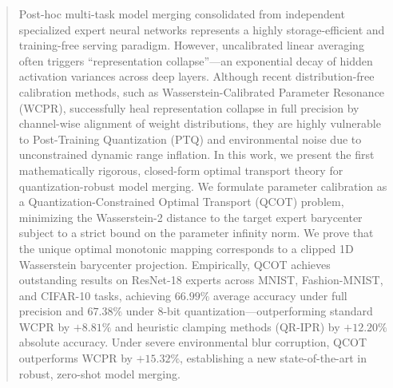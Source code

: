 \documentclass{article}
\theoremstyle{plain}
\theoremstyle{definition}
\theoremstyle{remark}
\begin{document}

\printAffiliationsAndNotice{}

\begin{abstract}
Post-hoc multi-task model merging consolidated from independent specialized expert neural networks represents a highly storage-efficient and training-free serving paradigm. However, uncalibrated linear averaging often triggers ``representation collapse''—an exponential decay of hidden activation variances across deep layers. Although recent distribution-free calibration methods, such as Wasserstein-Calibrated Parameter Resonance (WCPR), successfully heal representation collapse in full precision by channel-wise alignment of weight distributions, they are highly vulnerable to Post-Training Quantization (PTQ) and environmental noise due to unconstrained dynamic range inflation. In this work, we present the first mathematically rigorous, closed-form optimal transport theory for quantization-robust model merging. We formulate parameter calibration as a Quantization-Constrained Optimal Transport (QCOT) problem, minimizing the Wasserstein-2 distance to the target expert barycenter subject to a strict bound on the parameter infinity norm. We prove that the unique optimal monotonic mapping corresponds to a clipped 1D Wasserstein barycenter projection. Empirically, QCOT achieves outstanding results on ResNet-18 experts across MNIST, Fashion-MNIST, and CIFAR-10 tasks, achieving $66.99\%$ average accuracy under full precision and $67.38\%$ under 8-bit quantization—outperforming standard WCPR by $+8.81\%$ and heuristic clamping methods (QR-IPR) by $+12.20\%$ absolute accuracy. Under severe environmental blur corruption, QCOT outperforms WCPR by $+15.32\%$, establishing a new state-of-the-art in robust, zero-shot model merging.
\end{abstract}
\end{document}
